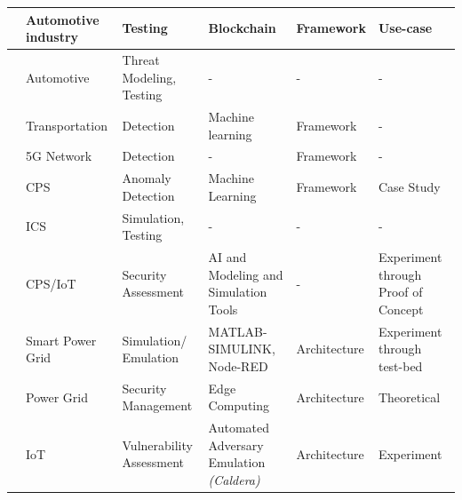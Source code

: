 \begin{longtable}{>{\small}p{0.5cm}p{2cm}p{2.9cm}p{3.0cm}p{3.0cm}p{2.0cm}}
    \cite{suhailSituationalAwareCyberphysical2022} & Automotive industry & Testing & Blockchain & Framework & Use-case \\
    \hline
    
    \cite{harrisonCybersecurityThreatModeling2022a} &  Automotive & Threat Modeling, Testing & - & - & - \\
    \hline

    \cite{aryaDetectionMaliciousNode2023a} &  Transportation & Detection & Machine learning & Framework & - \\
    \hline
    
    \cite{wangDigitalTwinNetwork2022a} &  5G Network & Detection & - & Framework & - \\
    \hline

    \cite{xuDigitalTwinbasedAnomaly2023a} &  CPS & Anomaly Detection & Machine Learning & Framework & Case Study \\
    \hline
    \cite{dietzUnleashingDigitalTwin2020} &  ICS & Simulation, Testing & - & - & - \\
    \hline
    \cite{epiphaniouDigitalTwinsCyber2023a} & CPS/IoT & Security Assessment & AI and Modeling and Simulation Tools & - & Experiment through Proof of Concept \\
    \hline
    \cite{ayyalusamyHybridDigitalTwin2022a} & Smart Power Grid & Simulation/ Emulation & MATLAB-SIMULINK, Node-RED & Architecture & Experiment through test-bed\\
    \hline
    \cite{sunResearchSecurityManagement2021a} & Power Grid & Security Management & Edge Computing & Architecture & Theoretical\\
    \hline

    
    \cite{vanderwalSecuringNetworksIoT2022a} & IoT & Vulnerability Assessment & Automated Adversary Emulation \textit{(Caldera)} & Architecture & Experiment\\
    \hline
    
\end{longtable}
% 



% 

% 

